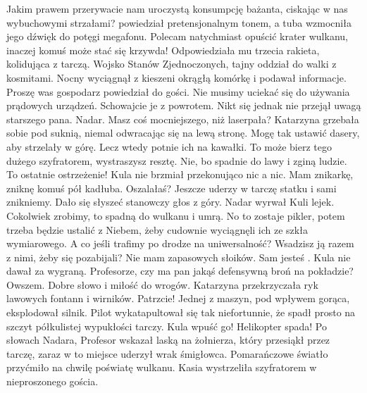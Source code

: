 \begin{dialogue}
\ds{} Jakim prawem przerywacie nam uroczystą konsumpcję bażanta, ciskając w nas wybuchowymi strzałami? \dm{}
powiedział pretensjonalnym tonem, a tuba wzmocniła jego dźwięk do potęgi megafonu. \dm{}
Polecam natychmiast opuścić krater wulkanu, inaczej komuś może stać się krzywda! \dm{} Odpowiedziała mu trzecia rakieta, kolidująca z tarczą.
\ds{} Wojsko Stanów Zjednoczonych, tajny oddział do walki z kosmitami. \dm{} Nocny wyciągnął z kieszeni okrągłą komórkę i podawał informacje.
\ds{} Proszę was \dm{} gospodarz powiedział do gości. \dm{} Nie musimy uciekać się do używania prądowych urządzeń. Schowajcie je z powrotem. \dm{} Nikt się jednak nie przejął uwagą starszego pana.
\ds{} Nadar. Masz coś mocniejszego, niż laserpała? \dm{} Katarzyna grzebała sobie pod suknią, niemal odwracając się na lewą stronę.
\ds{} Mogę tak ustawić dasery, aby strzelały w górę. Lecz wtedy potnie ich na kawałki.
\ds{} To może bierz tego dużego szyfratorem, wystraszysz resztę.
\ds{} Nie, bo spadnie do lawy i zginą ludzie.
\ds{} To ostatnie ostrzeżenie! \dm{} Kula nie brzmiał przekonująco nic a nic.
\ds{} Mam znikarkę, zniknę komuś pół kadłuba.
\ds{} Oszalałaś? Jeszcze uderzy w tarczę statku i sami znikniemy.
\ds{}  \dm{} Dało się słyszeć stanowczy głos z góry.
\ds{}  \dm{} Nadar wyrwał Kuli lejek.
\ds{} Cokolwiek zrobimy, to spadną do wulkanu i umrą.
\ds{} No to zostaje pikler, potem trzeba będzie ustalić z Niebem, żeby cudownie wyciągnęli ich ze szkła wymiarowego.
\ds{} A co jeśli trafimy po drodze na uniwersalność? Wsadzisz ją razem z nimi, żeby się pozabijali? Nie mam zapasowych słoików.
\ds{} 
\ds{} Sam jesteś . \dm{} Kula nie dawał za wygraną.
\ds{} Profesorze, czy ma pan jakąś defensywną broń na pokładzie?
\ds{} Owszem. Dobre słowo i miłość do wrogów.
\ds{} 
\ds{}  \dm{} Katarzyna przekrzyczała ryk lawowych fontann i wirników.
\ds{} Patrzcie! \dm{} Jednej z maszyn, pod wpływem gorąca, eksplodował silnik. Pilot wykatapultował się tak niefortunnie, że spadł prosto na szczyt półkulistej wypukłości tarczy.
\ds{} Kula wpuść go! Helikopter spada! \dm{} Po słowach Nadara, Profesor wskazał laską na żołnierza, który przesiąkł przez tarczę, zaraz w to miejsce uderzył wrak śmigłowca. 
Pomarańczowe światło przyćmiło na chwilę poświatę wulkanu. Kasia wystrzeliła szyfratorem w nieproszonego gościa.

\end{dialogue}
